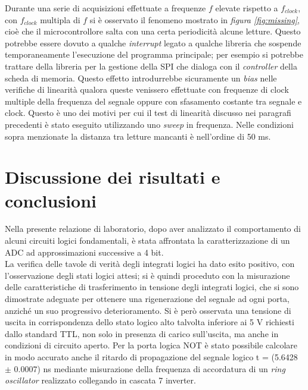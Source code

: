 \documentclass[journal]{IEEEtran}
\begin{document}
Durante una serie di acquisizioni effettuate a frequenze $f$ elevate rispetto a $f_{clock}$, con $f_{clock}$ multipla di $f$ si è osservato il fenomeno mostrato in \textit{figura \ref{fig:missing}}, cioè che il microcontrollore salta con una certa periodicità alcune letture. Questo potrebbe essere dovuto a qualche \textit{interrupt} legato a qualche libreria che sospende temporaneamente l'esecuzione del programma principale; per esempio si potrebbe trattare della libreria per la gestione della SPI che dialoga con il \textit{controller} della scheda di memoria. Questo effetto introdurrebbe sicuramente un \textit{bias} nelle verifiche di linearità qualora queste venissero effettuate con frequenze di clock multiple della frequenza del segnale oppure con sfasamento costante tra segnale e clock. Questo è uno dei motivi per cui il test di linearità discusso nei paragrafi precedenti è stato eseguito utilizzando uno \textit{sweep} in frequenza. Nelle condizioni sopra menzionate la distanza tra letture mancanti è nell'ordine di 50 ms. 



\section{Discussione dei risultati e conclusioni}
Nella presente relazione di laboratorio, dopo aver analizzato il comportamento di alcuni circuiti logici fondamentali, è stata affrontata la caratterizzazione di un ADC ad approssimazioni successive a 4 bit. 
\\

La verifica delle tavole di verità degli integrati logici ha dato esito positivo, con l'osservazione degli stati logici attesi; si è quindi proceduto con la misurazione delle caratteristiche di trasferimento in tensione degli integrati logici, che si sono dimostrate adeguate per ottenere una rigenerazione del segnale ad ogni porta, anziché un suo progressivo deterioramento. Si è però osservata una tensione di uscita in corrispondenza dello stato logico alto talvolta inferiore ai 5 V richiesti dallo standard TTL, non solo in presenza di carico sull'uscita, ma anche in condizioni di circuito aperto. Per la porta logica NOT è stato possibile calcolare in modo accurato anche il ritardo di propagazione del segnale logico t = (5.6428 $\pm$ 0.0007) ns mediante misurazione della frequenza di accordatura di un \textit{ring oscillator} realizzato collegando in cascata 7 inverter.
\\
\end{document}
